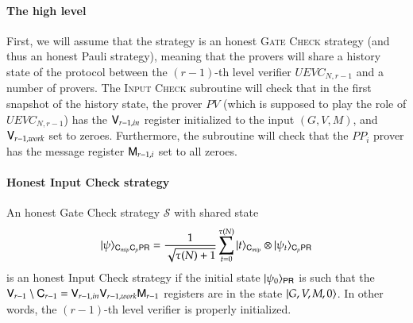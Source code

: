 \paragraph{The high level} First, we will assume that the strategy is an honest \textsc{Gate Check} strategy (and thus an honest Pauli strategy), meaning that the provers will share a history state of the protocol between the $(r-1)$-th level verifier $UEVC_{N,r-1}$ and a number of provers. The \textsc{Input Check} subroutine will check that in the first snapshot of the history state, the prover $PV$ (which is supposed to play the role of $UEVC_{N,r-1}$) has the ${\mathsf{V}}_{r-1,in}$ register initialized to the input $(G,V,M)$, and ${\mathsf{V}}_{r-1,work} $ set to zeroes. Furthermore, the subroutine will check that the $PP_i$ prover has the message register ${\mathsf{M}}_{r-1,i}$ set to all zeroes.

\paragraph{Honest Input Check strategy}
An honest Gate Check strategy $\mathcal{S}$ with shared state
\[
	|\psi\rangle_{{\mathsf{C}}_{mip} {\mathsf{C}}_p {\mathsf{P}} {\mathsf{R}}} = \frac{1}{\sqrt{\tau(N) + 1}} \sum_{t = 0}^{\tau(N)} |t\rangle_{{\mathsf{C}}_{mip}} \otimes |\psi_t\rangle_{{\mathsf{C}}_p {\mathsf{P}} {\mathsf{R}}}
\]
is an honest Input Check strategy if the initial state $|\psi_0\rangle_{{\mathsf{P}} {\mathsf{R}}}$ is such that the ${\mathsf{V}}_{r-1} \setminus {\mathsf{C}}_{r-1} = {\mathsf{V}}_{r-1,in}{\mathsf{V}}_{r-1,work} {\mathsf{M}}_{r-1}$ registers are in the state $|G,V,M,0\rangle$. In other words, the $(r-1)$-th level verifier is properly initialized.




